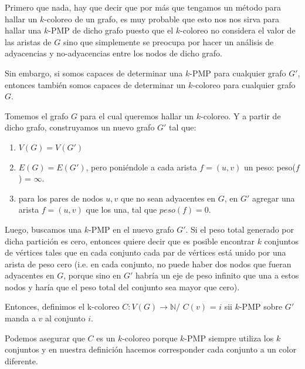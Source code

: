 \documentclass[11pt, a4paper, twoside]{article}
\begin{document}
\begin{enumerate}
				  Primero que nada, hay que decir que por más que tengamos un método para hallar
				  un $k$-coloreo de un grafo, es muy probable que esto nos nos sirva para hallar una
				  $k$-PMP de dicho grafo puesto que el $k$-coloreo no considera el valor de las 
				  aristas de $G$ sino que simplemente se preocupa por hacer un análisis de 
				  adyacencias y no-adyacencias entre los nodos de dicho grafo.
				  
				  Sin embargo, si somos capaces de determinar una $k$-PMP para cualquier grafo $G'$, entonces también
				  somos capaces de determinar un $k$-coloreo para cualquier
				  grafo $G$.
				  
				  Tomemos el grafo $G$ para el cual queremos hallar un $k$-coloreo. Y a partir de dicho grafo, construyamos
				  un nuevo grafo $G'$ tal que: 
				  \begin{enumerate}
					\item $V(G) = V(G')$ 
					\item $E(G) = E(G')$, pero poniéndole a cada arista $f=(u,v)$ un peso: peso($f$) = $\infty$.
					\item para los pares de nodos $u,v$ que no sean adyacentes en $G$, en $G'$ agregar
						  una arista $f=(u,v)$ que los una, tal que $peso(f) = 0$. 
				  \end{enumerate}
				  Luego, buscamos una $k$-PMP en el nuevo grafo $G'$. Si el peso total generado por dicha 
				  partición es cero, entonces quiere decir que es posible encontrar $k$ 
				  conjuntos de vértices tales que en cada conjunto cada par de vértices está unido por una arista
				  de peso cero (i.e. en cada conjunto, no puede haber
				  dos nodos que fueran adyacentes en $G$, porque sino en $G'$ habría un eje de peso infinito
				  que una a estos nodos y haría que el peso total del conjunto sea mayor que cero). 
				  
				  Entonces, definimos el k-coloreo $C: V(G) \rightarrow \mathbb{N} / $ $C(v)$ = $i$ sii $k$-PMP sobre $G'$ 
				  manda a $v$ al conjunto $i$.
				  
				  Podemos asegurar que $C$ es un $k$-coloreo porque $k$-PMP siempre utiliza los $k$ conjuntos y en nuestra definición
				  hacemos corresponder cada conjunto a un color diferente.
				  

\end{enumerate}
\end{document}
